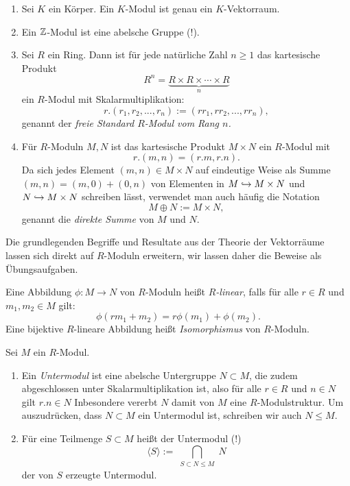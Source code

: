 \documentclass{book}
\begin{document}
\begin{exas}
    \label{exas:moduln}
    \begin{enumerate}
    \item Sei $K$ ein Körper. Ein $K$-Modul ist genau ein $K$-Vektorraum.
    \item Ein $\mathbb{Z}$-Modul ist eine abelsche Gruppe (!).
    \item Sei $R$ ein Ring. Dann ist für jede natürliche Zahl $n \ge 1$ das kartesische Produkt 
        \[
            R^n = \underbrace{R \times R \times \cdots \times R}_{n}
        \]
        ein $R$-Modul mit Skalarmultiplikation: 
        \[
            r.(r_1,r_2,...,r_n) := (rr_1,rr_2,...,rr_n),
        \]
        genannt der \emph{freie Standard $R$-Modul vom Rang $n$.}
    \item Für $R$-Moduln $M,N$ ist das kartesische Produkt $M \times N$ ein $R$-Modul mit
        \[
            r.(m,n) = (r.m,r.n).
        \]
        Da sich jedes Element $(m,n) \in M \times N$ auf eindeutige Weise als
        Summe $(m,n) = (m,0) + (0,n)$ von Elementen in $M \hookrightarrow M \times N$ und $N \hookrightarrow M \times N$ schreiben
        lässt, verwendet man auch häufig die Notation 
        \[
            M \oplus N := M \times N,
        \]
        genannt die \emph{direkte Summe} von $M$ und $N$.
    \end{enumerate}
\end{exas}

Die grundlegenden Begriffe und Resultate aus der Theorie der Vektorräume lassen sich direkt
auf $R$-Moduln erweitern, wir lassen daher die Beweise als Übungsaufgaben.

\begin{defi}
    \label{defi:hom}
    Eine Abbildung $\phi: M \to N$ von $R$-Moduln heißt \emph{$R$-linear}, falls für
    alle $r \in R$ und $m_1,m_2 \in M$ gilt:
    \[
        \phi(r m_1 + m_2 ) = r \phi(m_1) + \phi(m_2).
    \]
    Eine bijektive $R$-lineare Abbildung heißt \emph{Isomorphismus} von
    $R$-Moduln.
\end{defi}

\begin{defi}
    \label{defi:unter}
    Sei $M$ ein $R$-Modul. 

    \begin{enumerate}
        \item Ein \emph{Untermodul} ist eine abelsche Untergruppe $N
    \subset M$, die zudem abgeschlossen unter Skalarmultiplikation ist, also für
    alle $r \in R$ und $n \in N$ gilt $r.n \in N$ Inbesondere vererbt $N$ damit
    von $M$ eine $R$-Modulstruktur. Um auszudrücken, dass $N \subset M$ ein
    Untermodul ist, schreiben wir auch $N \le M$. 
        \item Für eine Teilmenge $S \subset M$ heißt der Untermodul (!)
            \[
                \langle S \rangle := \bigcap_{\substack{S \subset N \le M }} N
            \]
            der von $S$ erzeugte Untermodul. 
    \end{enumerate} 
\end{defi}
\end{document}
